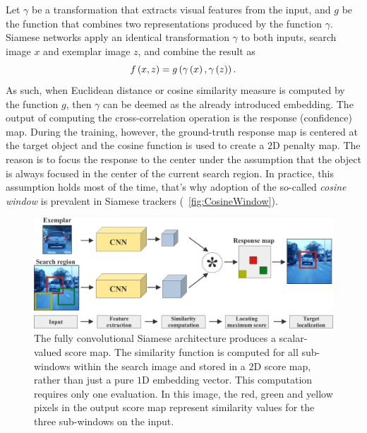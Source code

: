 Let $\gamma$ be a transformation that extracts visual features from the input, and $g$ be the function that combines two representations produced by the function $\gamma$. Siamese networks apply an identical transformation $\gamma$ to both inputs, search image $x$ and exemplar image $z$, and combine the result as
\begin{equation}
    {f} \left( x, z \right) = {g} \left( {\gamma} \left( x \right), {\gamma} \left( z \right) \right).
\end{equation}
As such, when Euclidean distance or cosine similarity measure is computed by the function $g$, then $\gamma$ can be deemed as the already introduced embedding. The output of computing the cross-correlation operation is the response (confidence) map. During the training, however, the ground-truth response map is centered at the target object and the cosine function is used to create a $2$D penalty map. The reason is to focus the response to the center under the assumption that the object is always focused in the center of the current search region. In practice, this assumption holds most of the time, that's why adoption of the so-called \emph{cosine window} is prevalent in Siamese trackers (\figtext{}~\ref{fig:CosineWindow}).

\begin{figure}[!t]
    \centerline{\includegraphics[width=0.9\linewidth]{figures/theoretical_foundations/fully_cnn_siam_tracking_architecture.pdf}}
    \caption[\gls{siamfc} architecture]{The fully convolutional Siamese architecture produces a scalar-valued score map. The similarity function is computed for all sub-windows within the search image and stored in a $2$D score map, rather than just a pure $1$D embedding vector. This computation requires only one evaluation. In this image, the red, green and yellow pixels in the output score map represent similarity values for the three sub-windows on the input.}
    \label{fig:FullyCNNSiamTrackingArch}
\end{figure}

